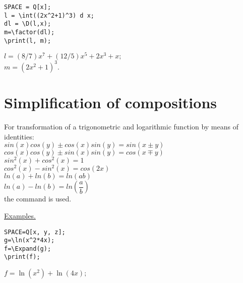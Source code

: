 \begin{verbatim}
SPACE = Q[x];
l = \int((2x^2+1)^3) d x;
dl = \D(l,x);
m=\factor(dl);
\print(l, m);
\end{verbatim}
\vspace*{-3mm}

{$l = (8/7)x^7+(12/5)x^5+2x^3+x; $\\
\hspace*{4mm} $m = (2x^2+1)^3. $}


\section{Simplification of compositions}

For transformation of a trigonometric and logarithmic function by means of identities:\\
$sin(x)cos(y) \pm cos(x)sin(y) = sin(x \pm y)$ \\
$cos(x)cos(y) \pm sin(x)sin(y) = cos(x \mp y)$ \\
$sin^2(x) + cos^2(x) = 1$ \\
$cos^2(x) - sin^2(x) = cos(2x)$ \\
$ln(a) + ln(b) = ln(ab)$ \\
$ln(a) - ln(b) = ln(\dfrac{a}{b})$ \\
the command  is used. 

\smallskip
\underline{Examples. }

\begin{verbatim}
SPACE=Q[x, y, z]; 
g=\ln(x^2*4x); 
f=\Expand(g); 
\print(f);
\end{verbatim}\vspace*{-3mm}

{\hspace*{4mm} $f=\ln(x^2) + \ln(4x);$} 

